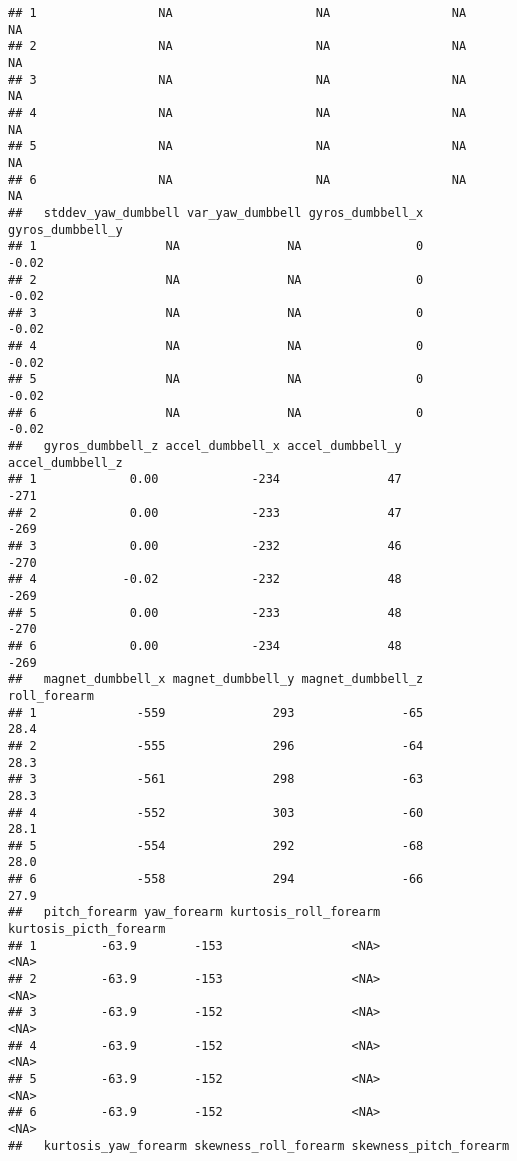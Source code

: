 \documentclass[
]{article}
\begin{document}
\begin{verbatim}
## 1                 NA                    NA                 NA               NA
## 2                 NA                    NA                 NA               NA
## 3                 NA                    NA                 NA               NA
## 4                 NA                    NA                 NA               NA
## 5                 NA                    NA                 NA               NA
## 6                 NA                    NA                 NA               NA
##   stddev_yaw_dumbbell var_yaw_dumbbell gyros_dumbbell_x gyros_dumbbell_y
## 1                  NA               NA                0            -0.02
## 2                  NA               NA                0            -0.02
## 3                  NA               NA                0            -0.02
## 4                  NA               NA                0            -0.02
## 5                  NA               NA                0            -0.02
## 6                  NA               NA                0            -0.02
##   gyros_dumbbell_z accel_dumbbell_x accel_dumbbell_y accel_dumbbell_z
## 1             0.00             -234               47             -271
## 2             0.00             -233               47             -269
## 3             0.00             -232               46             -270
## 4            -0.02             -232               48             -269
## 5             0.00             -233               48             -270
## 6             0.00             -234               48             -269
##   magnet_dumbbell_x magnet_dumbbell_y magnet_dumbbell_z roll_forearm
## 1              -559               293               -65         28.4
## 2              -555               296               -64         28.3
## 3              -561               298               -63         28.3
## 4              -552               303               -60         28.1
## 5              -554               292               -68         28.0
## 6              -558               294               -66         27.9
##   pitch_forearm yaw_forearm kurtosis_roll_forearm kurtosis_picth_forearm
## 1         -63.9        -153                  <NA>                   <NA>
## 2         -63.9        -153                  <NA>                   <NA>
## 3         -63.9        -152                  <NA>                   <NA>
## 4         -63.9        -152                  <NA>                   <NA>
## 5         -63.9        -152                  <NA>                   <NA>
## 6         -63.9        -152                  <NA>                   <NA>
##   kurtosis_yaw_forearm skewness_roll_forearm skewness_pitch_forearm

\end{verbatim}
\end{document}
